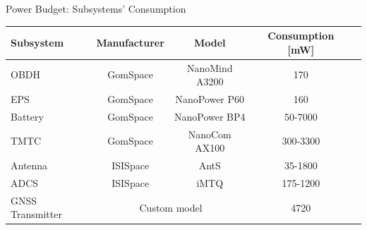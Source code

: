 \begin{frame}{Power Budget: Subsystems' Consumption}

    \begin{table}[!ht]\scriptsize
        \centering
        \begin{tabular}{lcccc}
            \toprule[1.5pt]
            \textbf{Subsystem} & \textbf{Manufacturer} & \textbf{Model} & \textbf{Consumption [mW]} \\
            \midrule
            OBDH     & GomSpace & NanoMind A3200 & 170 \\
            EPS      & GomSpace & NanoPower P60  & 160 \\
            Battery  & GomSpace & NanoPower BP4  & 50-7000 \\
            TMTC     & GomSpace & NanoCom AX100  & 300-3300 \\
            Antenna  & ISISpace & AntS           & 35-1800 \\
            ADCS     & ISISpace & iMTQ           & 175-1200 \\
            GNSS Transmitter & \multicolumn{2}{c}{Custom model} & 4720 \\
            \bottomrule[1.5pt]
        \end{tabular}
        \label{tab:power-budget-subsystems}
    \end{table}

\end{frame}

